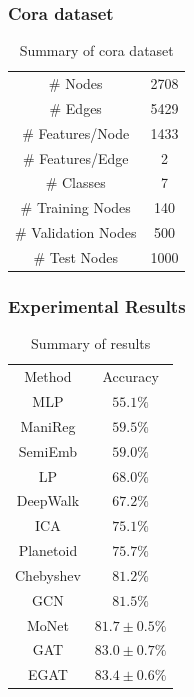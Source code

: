 \documentclass[compress]{beamer}
\begin{document}
\begin{frame}
  \frametitle{Cora dataset}
  \begin{table}
    \centering
    \begin{tabular}{|c|c|}
      \hline
      \# Nodes & 2708\\
      \# Edges & 5429\\
      \# Features/Node & 1433\\
      \# Features/Edge & 2\\
      \# Classes & 7\\
      \# Training Nodes & 140\\
      \# Validation Nodes & 500\\
      \# Test Nodes & 1000\\
      \hline
    \end{tabular}
    \caption{Summary of cora dataset}
    \label{tab:cora}
  \end{table}
\end{frame}

\begin{frame}
  \frametitle{Experimental Results}
  \begin{table}
    \centering
    \begin{tabular}{|c|c|}
      \hline
      Method & Accuracy\\
      MLP & $55.1\%$\\
      ManiReg \cite{belkin_manifold_2006} & $59.5\%$\\
      SemiEmb \cite{weston_deep_2012} & $59.0\%$\\
      LP \cite{zhu_semi-supervised_2003} & $68.0\%$\\
      DeepWalk \cite{perozzi_deepwalk:_2014}& $67.2\%$\\
      ICA \cite{getoor_link-based_2005}& $75.1\%$\\
      Planetoid \cite{yang_revisiting_2016}& $75.7\%$\\
      Chebyshev \cite{defferrard_convolutional_2016}& $81.2\%$\\
      GCN \cite{kipf_semi-supervised_2016}& $81.5\%$\\
      MoNet \cite{monti_geometric_2017}& $81.7\pm{}0.5\%$\\
      GAT & $83.0\pm{}0.7\%$\\
      EGAT & $83.4\pm{}0.6\%$\\
      \hline
    \end{tabular}
    \caption{Summary of results}
    \label{tab:result}
  \end{table}
\end{frame}
\end{document}
